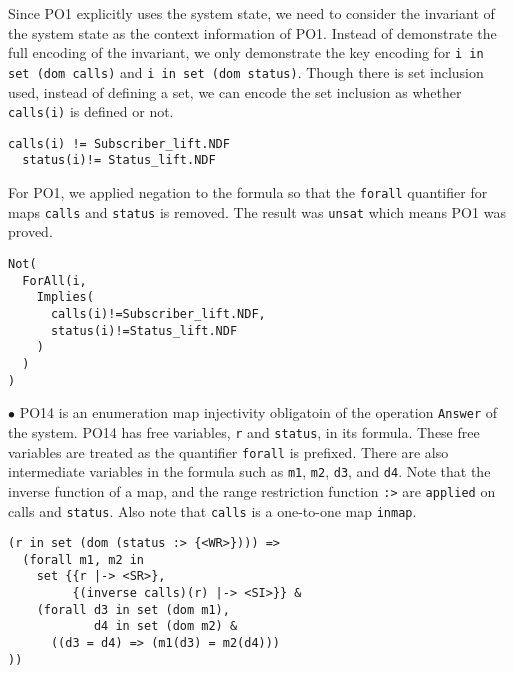 Since PO1 explicitly uses the system state, we need to consider the invariant of the system state as the context information of PO1. 
Instead of demonstrate the full encoding of the invariant, we only demonstrate the key encoding for {\tt i in set (dom calls)} and {\tt i in set (dom status)}. Though there is set inclusion used, instead of defining a set, we can encode the set inclusion as whether {\tt calls(i)} is defined or not.

\begin{mdframed}[roundcorner=5pt,shadow=true]
\begin{Verbatim}[fontsize=\small]
  calls(i) != Subscriber_lift.NDF
  status(i)!= Status_lift.NDF
\end{Verbatim}
\end{mdframed}

For PO1, we applied negation to the formula so that the {\tt forall} quantifier for maps {\tt calls} and {\tt status} is removed. The result was {\tt unsat} which means PO1 was proved.

\begin{mdframed}[roundcorner=5pt,shadow=true]
\begin{Verbatim}[fontsize=\small]
Not(
  ForAll(i,
    Implies(
      calls(i)!=Subscriber_lift.NDF,
      status(i)!=Status_lift.NDF
    )
  )
)
\end{Verbatim}
\end{mdframed}

$\bullet$ PO14 is an enumeration map injectivity obligatoin of the operation {\tt Answer} of the system. PO14 has free variables, {\tt r} and {\tt status}, in its formula. These free variables are treated as the quantifier {\tt forall} is prefixed. There are also intermediate variables in the formula such as {\tt m1}, {\tt m2}, {\tt d3}, and {\tt d4}. Note that the inverse function of a map, and the range restriction function {\tt :>} are {\tt applied} on calls and {\tt status}. Also note that {\tt calls} is a one-to-one map {\tt inmap}.

\begin{mdframed}[roundcorner=5pt]
\begin{Verbatim}[fontsize=\small]
(r in set (dom (status :> {<WR>}))) =>
  (forall m1, m2 in 
    set {{r |-> <SR>}, 
         {(inverse calls)(r) |-> <SI>}} &
    (forall d3 in set (dom m1),
            d4 in set (dom m2) &
      ((d3 = d4) => (m1(d3) = m2(d4)))
))
\end{Verbatim}
\end{mdframed}

